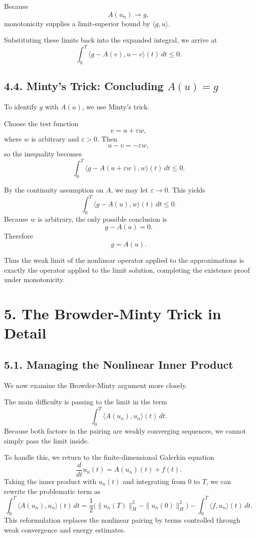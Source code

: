 \documentclass[11pt]{article}
\theoremstyle{definition}
\theoremstyle{remark}
\begin{document}
Because
\[
A(u_n)\rightharpoonup g,
\]
monotonicity supplies a limit-superior bound by \(\langle g,u\rangle\).

Substituting these limits back into the expanded integral, we arrive at
\[
\int_0^T \langle g-A(v),u-v\rangle(t)\,dt\le 0.
\]

\subsection*{4.4. Minty's Trick: Concluding \(A(u)=g\)}
To identify \(g\) with \(A(u)\), we use Minty's trick.

Choose the test function
\[
v=u+\varepsilon w,
\]
where \(w\) is arbitrary and \(\varepsilon>0\). Then
\[
u-v=-\varepsilon w,
\]
so the inequality becomes
\[
\int_0^T \langle g-A(u+\varepsilon w),w\rangle(t)\,dt\le 0.
\]

By the continuity assumption on \(A\), we may let \(\varepsilon\to 0\). This yields
\[
\int_0^T \langle g-A(u),w\rangle(t)\,dt\le 0.
\]
Because \(w\) is arbitrary, the only possible conclusion is
\[
g-A(u)=0.
\]
Therefore
\[
g=A(u).
\]

Thus the weak limit of the nonlinear operator applied to the approximations is exactly the operator applied to the limit solution, completing the existence proof under monotonicity.

\section*{5. The Browder-Minty Trick in Detail}

\subsection*{5.1. Managing the Nonlinear Inner Product}
We now examine the Browder-Minty argument more closely.

The main difficulty is passing to the limit in the term
\[
\int_0^T \langle A(u_n),u_n\rangle(t)\,dt.
\]
Because both factors in the pairing are weakly converging sequences, we cannot simply pass the limit inside.

To handle this, we return to the finite-dimensional Galerkin equation
\[
\frac{d}{dt}u_n(t)=A(u_n)(t)+f(t).
\]
Taking the inner product with \(u_n(t)\) and integrating from \(0\) to \(T\), we can rewrite the problematic term as
\[
\int_0^T \langle A(u_n),u_n\rangle(t)\,dt
=
\frac12\bigl(\|u_n(T)\|_H^2-\|u_n(0)\|_H^2\bigr)
-\int_0^T \langle f,u_n\rangle(t)\,dt.
\]
This reformulation replaces the nonlinear pairing by terms controlled through weak convergence and energy estimates.
\end{document}
